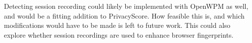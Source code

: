 \documentclass[
    fontsize=12pt,
    headings=small,
    parskip=half,
    bibliography=totoc,
    numbers=noenddot,
    open=any
    ]{scrreprt}
\begin{document}
Detecting session recording could likely be implemented with OpenWPM as well,
and would be a fitting addition to PrivacyScore.
How feasible this is, and which modifications would have to be made is left to
future work. This could also explore whether session recordings are used
to enhance browser fingerprints.




\end{document}
